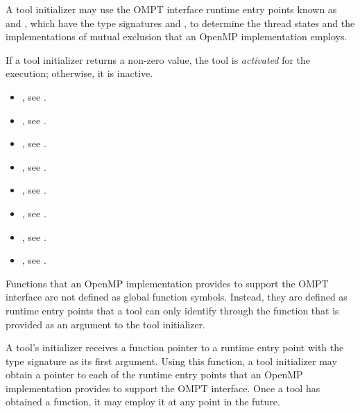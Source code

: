 A tool initializer may use the OMPT interface runtime entry points known as 
 and , which have 
the type signatures  and 
, to determine the thread states and the 
implementations of mutual exclusion that an OpenMP implementation employs.

If a tool initializer returns a non-zero value, the tool is \emph{activated} 
for the execution; otherwise, it is inactive.

\crossreferences
\begin{itemize}
\item {}, see
.

\item {}, see .

\item {}, 
see .

\item {}, see .

\item {}, 
see .

\item {}, see .

\item {}, see .

\item {}, see .
\end{itemize}



\label{sec:ompt-bind}

Functions that an OpenMP implementation provides to support the OMPT interface
are not defined as global function symbols. Instead, they are defined as runtime 
entry points that a tool can only identify through the  function that
is provided as an argument to the tool initializer. 

A tool's initializer receives a function pointer to a 
runtime entry point with the type signature
 as its first argument. Using this
function, a tool initializer may obtain a pointer to each of the
runtime entry points that an OpenMP implementation provides to support
the OMPT interface. Once a tool has obtained a
 function, it may employ it at any point in the future.

